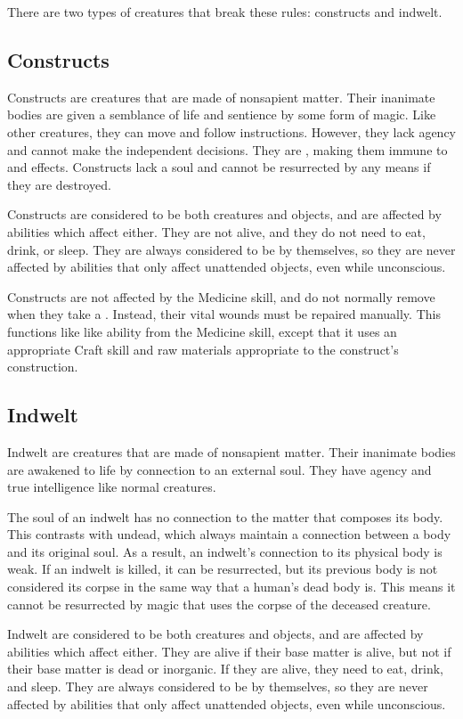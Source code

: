   There are two types of creatures that break these rules: constructs and indwelt.

  \subsection{Constructs}\label{Constructs}
    Constructs are creatures that are made of nonsapient matter.
    Their inanimate bodies are given a semblance of life and sentience by some form of magic.
    Like other creatures, they can move and follow instructions.
    However, they lack agency and cannot make the independent decisions.
    They are , making them immune to  and  effects.
    Constructs lack a soul and cannot be resurrected by any means if they are destroyed.

    Constructs are considered to be both creatures and objects, and are affected by abilities which affect either.
    They are not alive, and they do not need to eat, drink, or sleep.
    They are always considered to be  by themselves, so they are never affected by abilities that only affect unattended objects, even while unconscious.

    Constructs are not affected by the Medicine skill, and do not normally remove  when they take a .
    Instead, their vital wounds must be repaired manually.
    This functions like like  ability from the Medicine skill, except that it uses an appropriate Craft skill and raw materials appropriate to the construct's construction.

  \subsection{Indwelt}\label{Indwelt}
    Indwelt are creatures that are made of nonsapient matter.
    Their inanimate bodies are awakened to life by connection to an external soul.
    They have agency and true intelligence like normal creatures.

    The soul of an indwelt has no connection to the matter that composes its body.
    This contrasts with undead, which always maintain a connection between a body and its original soul.
    As a result, an indwelt's connection to its physical body is weak.
    If an indwelt is killed, it can be resurrected, but its previous body is not considered its corpse in the same way that a human's dead body is.
    This means it cannot be resurrected by magic that uses the corpse of the deceased creature.

    Indwelt are considered to be both creatures and objects, and are affected by abilities which affect either.
    They are alive if their base matter is alive, but not if their base matter is dead or inorganic.
    If they are alive, they need to eat, drink, and sleep.
    They are always considered to be  by themselves, so they are never affected by abilities that only affect unattended objects, even while unconscious.
